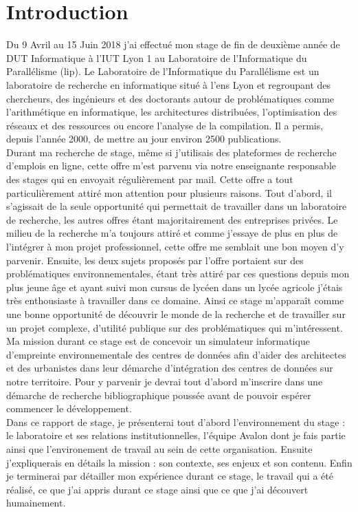 \newpage
\section*{Introduction}

Du 9 Avril au 15 Juin 2018 j'ai effectué mon stage de fin de deuxième année de DUT Informatique à l'IUT Lyon 1 au Laboratoire de l'Informatique du Parallélisme (\gls{lip}).
Le Laboratoire de l'Informatique du Parallélisme est un laboratoire de recherche en informatique situé à l'\gls{ens} Lyon et regroupant des chercheurs, des ingénieurs et des doctorants autour de problématiques comme l'arithmétique en informatique, les architectures distribuées, l'optimisation des réseaux et des ressources ou encore l'analyse de la compilation. Il a permis, depuis l'année 2000, de mettre au jour environ 2500 publications.\\

Durant ma recherche de stage, même si j'utilisais des plateformes de recherche d'emplois en ligne, cette offre m'est parvenu via notre enseignante responsable des stages qui en envoyait régulièrement par mail. Cette offre a tout particulièrement attiré mon attention pour plusieurs raisons. Tout d'abord, il s'agissait de la seule opportunité qui permettait de travailler dans un laboratoire de recherche, les autres offres étant majoritairement des entreprises privées. Le milieu de la recherche m'a toujours attiré et comme j'essaye de plus en plus de l'intégrer à mon projet professionnel, cette offre me semblait une bon moyen d'y parvenir. Ensuite, les deux sujets proposés par l'offre portaient sur des problématiques environnementales, étant très attiré par ces questions depuis mon plus jeune âge et ayant suivi mon cursus de lycéen dans un lycée agricole j'étais très enthousiaste à travailler dans ce domaine. Ainsi ce stage m'apparaît comme une bonne opportunité de découvrir le monde de la recherche et de travailler sur un projet complexe, d'utilité publique sur des problématiques qui m'intéressent.\\

Ma mission durant ce stage est de concevoir un simulateur informatique d'empreinte environnementale des centres de données afin d'aider des architectes et des urbanistes dans leur démarche d'intégration des centres de données sur notre territoire. Pour y parvenir je devrai tout d'abord m'inscrire dans une démarche de recherche bibliographique poussée avant de pouvoir espérer commencer le développement.\\

Dans ce rapport de stage, je présenterai tout d'abord l'environnement du stage : le laboratoire et ses relations institutionnelles, l'équipe Avalon dont je fais partie ainsi que l'environement de travail au sein de cette organisation. Ensuite j'expliquerais en détails la mission : son contexte, ses enjeux et son contenu. Enfin je terminerai par détailler mon expérience durant ce stage, le travail qui a été réalisé, ce que j'ai appris durant ce stage ainsi que ce que j'ai découvert humainement.